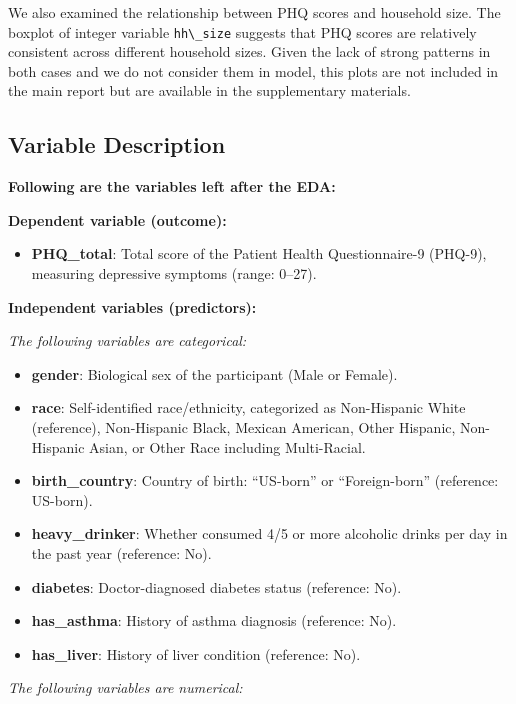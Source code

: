 \documentclass[
  11pt,
]{article}
\newcommand{\passthrough}[1]{#1}
\providecommand{\tightlist}{%
  \setlength{\itemsep}{0pt}\setlength{\parskip}{0pt}}
\begin{document}
We also examined the relationship between PHQ scores and household size. The boxplot of integer variable \passthrough{\lstinline!hh\_size!} suggests that PHQ scores are relatively consistent across different household sizes. Given the lack of strong patterns in both cases and we do not consider them in model, this plots are not included in the main report but are available in the supplementary materials.

\subsection{Variable Description}\label{variable-description}

\textbf{Following are the variables left after the EDA:}

\textbf{Dependent variable (outcome):}

\begin{itemize}
\tightlist
\item
  \textbf{PHQ\_total}: Total score of the Patient Health Questionnaire-9 (PHQ-9), measuring depressive symptoms (range: 0--27).
\end{itemize}

\textbf{Independent variables (predictors):}

\emph{The following variables are categorical:}

\begin{itemize}
\tightlist
\item
  \textbf{gender}: Biological sex of the participant (Male or Female).
\item
  \textbf{race}: Self-identified race/ethnicity, categorized as Non-Hispanic White (reference), Non-Hispanic Black, Mexican American, Other Hispanic, Non-Hispanic Asian, or Other Race including Multi-Racial.
\item
  \textbf{birth\_country}: Country of birth: ``US-born'' or ``Foreign-born'' (reference: US-born).
\item
  \textbf{heavy\_drinker}: Whether consumed 4/5 or more alcoholic drinks per day in the past year (reference: No).
\item
  \textbf{diabetes}: Doctor-diagnosed diabetes status (reference: No).
\item
  \textbf{has\_asthma}: History of asthma diagnosis (reference: No).
\item
  \textbf{has\_liver}: History of liver condition (reference: No).
\end{itemize}

\emph{The following variables are numerical:}
\end{document}
